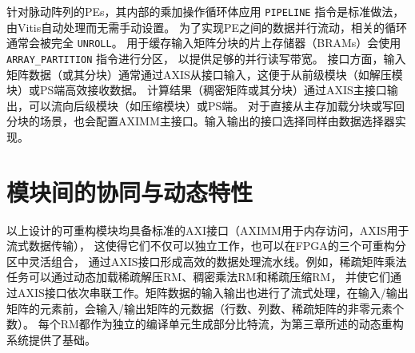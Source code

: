 针对脉动阵列的PEs，其内部的乘加操作循环体应用 \verb|PIPELINE| 指令是标准做法，由Vitis自动处理而无需手动设置。
为了实现PE之间的数据并行流动，相关的循环通常会被完全 \verb|UNROLL|。
用于缓存输入矩阵分块的片上存储器（BRAMs）会使用 \verb|ARRAY_PARTITION| 指令进行分区，
以提供足够的并行读写带宽。
接口方面，输入矩阵数据（或其分块）通常通过AXIS从接口输入，这便于从前级模块（如解压模块）或PS端高效接收数据。
计算结果（稠密矩阵或其分块）通过AXIS主接口输出，可以流向后级模块（如压缩模块）或PS端。
对于直接从主存加载分块或写回分块的场景，也会配置AXIMM主接口。输入输出的接口选择同样由数据选择器实现。

\section{模块间的协同与动态特性}

以上设计的可重构模块均具备标准的AXI接口（AXIMM用于内存访问，AXIS用于流式数据传输），
这使得它们不仅可以独立工作，也可以在FPGA的三个可重构分区中灵活组合，
通过AXIS接口形成高效的数据处理流水线。例如，稀疏矩阵乘法任务可以通过动态加载稀疏解压RM、稠密乘法RM和稀疏压缩RM，
并使它们通过AXIS接口依次串联工作。矩阵数据的输入输出也进行了流式处理，在输入/输出矩阵的元素前，会输入/输出矩阵的元数据（行数、列数、稀疏矩阵的非零元素个数）。
每个RM都作为独立的编译单元生成部分比特流，为第三章所述的动态重构系统提供了基础。
